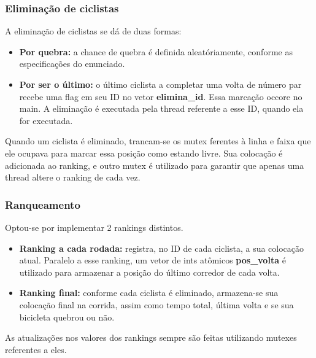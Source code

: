 \documentclass{beamer}
\begin{document}
\begin{frame}
\frametitle{Eliminação de ciclistas}
A eliminação de ciclistas se dá de duas formas:

\begin{itemize}
\item \textbf{Por quebra:} a chance de quebra é definida aleatóriamente, conforme as especificações do enunciado.
\item \textbf{Por ser o último:} o último ciclista a completar uma volta de número par recebe uma flag em seu ID no vetor \textbf{elimina\_id}. Essa marcação occore no main. A eliminação é executada pela thread referente a esse ID, quando ela for executada. 
\end{itemize}

Quando um ciclista é eliminado, trancam-se os mutex ferentes à linha e faixa que ele ocupava para marcar essa posição como estando livre. Sua colocação é adicionada ao ranking, e outro mutex é utilizado para garantir que apenas uma thread altere o ranking de cada vez.
\end{frame}




\begin{frame}
\frametitle{Ranqueamento}
Optou-se por implementar 2 rankings distintos.


\begin{itemize}
\item \textbf{Ranking a cada rodada:} registra, no ID de cada ciclista, a sua colocação atual. Paralelo a esse ranking, um vetor de ints atômicos \textbf{pos\_volta} é utilizado para armazenar a posição do último corredor de cada volta.

\item \textbf{Ranking final:} conforme cada ciclista é eliminado, armazena-se sua colocação final na corrida, assim como tempo total, última volta e se sua bicicleta quebrou ou não.   
\end{itemize}

As atualizações nos valores dos rankings sempre são feitas utilizando mutexes referentes a eles.
\end{frame}
\end{document}
